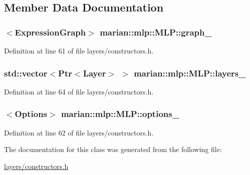 \subsection{Member Data Documentation}
\subsubsection[{\texorpdfstring{graph\+\_\+}{graph_}}]{$<${\bf Expression\+Graph}$>$ marian\+::mlp\+::\+M\+L\+P\+::graph\+\_\+\hspace{0.3cm}{\ttfamily [protected]}}\hypertarget{classmarian_1_1mlp_1_1MLP_a61b6155380706d5c2afdbeeaa0994008}{}\label{classmarian_1_1mlp_1_1MLP_a61b6155380706d5c2afdbeeaa0994008}


Definition at line 61 of file layers/constructors.\+h.

\subsubsection[{\texorpdfstring{layers\+\_\+}{layers_}}]{\setlength{\rightskip}{0pt plus 5cm}std\+::vector$<${\bf Ptr}$<$Layer$>$ $>$ marian\+::mlp\+::\+M\+L\+P\+::layers\+\_\+\hspace{0.3cm}{\ttfamily [protected]}}\hypertarget{classmarian_1_1mlp_1_1MLP_a79aa502c44a04f6eea99a6b304bd01e9}{}\label{classmarian_1_1mlp_1_1MLP_a79aa502c44a04f6eea99a6b304bd01e9}


Definition at line 64 of file layers/constructors.\+h.

\subsubsection[{\texorpdfstring{options\+\_\+}{options_}}]{$<${\bf Options}$>$ marian\+::mlp\+::\+M\+L\+P\+::options\+\_\+\hspace{0.3cm}{\ttfamily [protected]}}\hypertarget{classmarian_1_1mlp_1_1MLP_acd5930ecb6a6da66a793244071b10b5c}{}\label{classmarian_1_1mlp_1_1MLP_acd5930ecb6a6da66a793244071b10b5c}


Definition at line 62 of file layers/constructors.\+h.



The documentation for this class was generated from the following file\+:\begin{DoxyCompactItemize}
\item 
\hyperlink{layers_2constructors_8h}{layers/constructors.\+h}\end{DoxyCompactItemize}
